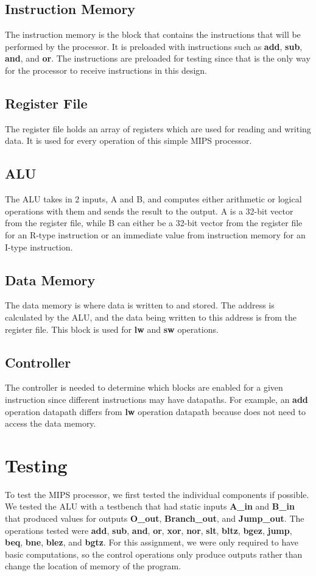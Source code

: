 \documentclass{article}
\begin{document}
	\subsection{Instruction Memory}
	The instruction memory is the block that contains the instructions that will be performed by the processor. It is preloaded with instructions such as \textbf{add}, \textbf{sub}, \textbf{and}, and \textbf{or}. The instructions are preloaded for testing since that is the only way for the processor to receive instructions in this design.
	
	\subsection{Register File}
	The register file holds an array of registers which are used for reading and writing data. It is used for every operation of this simple MIPS processor. 
	
	\subsection{ALU}
	The ALU takes in 2 inputs, A and B, and computes either arithmetic or logical operations with them and sends the result to the output. A is a 32-bit vector from the register file, while B can either be a 32-bit vector from the register file for an R-type instruction or an immediate value from instruction memory for an I-type instruction.
	
	\subsection{Data Memory}
	The data memory is where data is written to and stored. The address is calculated by the ALU, and the data being written to this address is from the register file. This block is used for \textbf{lw} and \textbf{sw} operations. 
	
 \subsection{Controller}
	The controller is needed to determine which blocks are enabled for a given instruction since different instructions may have datapaths. For example, an \textbf{add} operation datapath differs from \textbf{lw} operation datapath because  does not need to access the data memory.
		
\section{Testing}
To test the MIPS processor, we first tested the individual components if possible. We tested the ALU with a testbench that had static inputs \textbf{A\_in} and \textbf{B\_in} that produced values for outputs \textbf{O\_out}, \textbf{Branch\_out}, and \textbf{Jump\_out}. The operations tested were \textbf{add}, \textbf{sub}, \textbf{and}, \textbf{or}, \textbf{xor}, \textbf{nor}, \textbf{slt}, \textbf{bltz}, \textbf{bgez}, \textbf{jump}, \textbf{beq}, \textbf{bne}, \textbf{blez}, and \textbf{bgtz}. For this assignment, we were only required to have basic computations, so the control operations only produce outputs rather than change the location of memory of the program.
\end{document}
